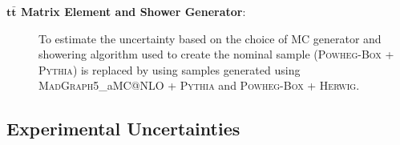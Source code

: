 \begin{description}

\item[\textbf{$\textbf{t}\bar{\textbf{t}}$ Matrix Element and Shower Generator}:]  To estimate the uncertainty based on the choice of MC generator and showering algorithm used to create the nominal sample (\textsc{Powheg-Box + Pythia}) is replaced by using samples generated using \textsc{MadGraph5\_}a\textsc{MC@NLO + Pythia} and \textsc{Powheg-Box + Herwig}.
\end{description}

\subsection{Experimental Uncertainties}
